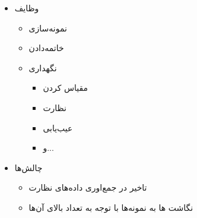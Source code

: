 \documentclass{beamer}
\makeatletter
\newcommand{\RTList}{\raggedleft\rightskip\@totalleftmargin}
\makeatother
\begin{document}
\begin{persian}
\begin{frame}{}
    \begin{itemize}\RTList{}
        \justifying
        \item وظایف
        \begin{itemize}\RTList{}
            \item نمونه‌سازی
            \item خاتمه‌دادن
            \item نگهداری
            \begin{itemize}\RTList{}
                \item مقیاس کردن
                \item نظارت
                \item عیب‌یابی
                \item و...
            \end{itemize}
        \end{itemize}
        \item چالش‌ها
        \begin{itemize}\RTList{}
            \item تاخیر در جمع‌اوری داده‌های نظارت
            \item نگاشت ها به نمونه‌ها با توجه به تعداد بالای آن‌ها
        \end{itemize}
    \end{itemize}
\end{frame}
\begin{frame}{}

\end{frame}
\end{persian}
\end{document}
